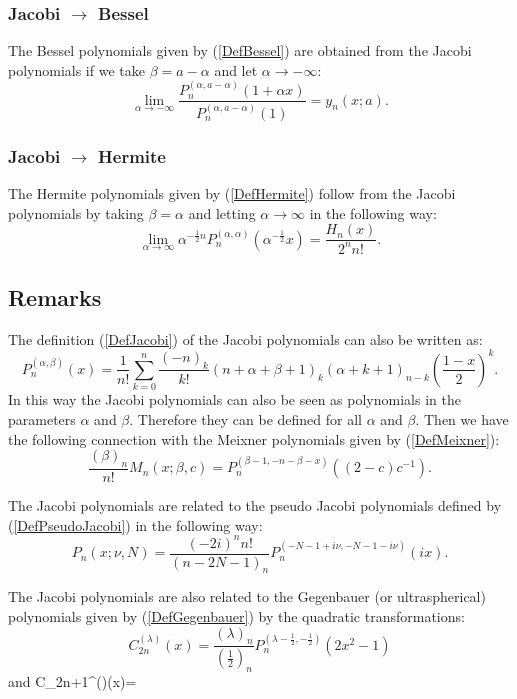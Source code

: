 \documentclass[envcountchap,graybox]{svmono}
\newcounter{rom}
\begin{document}
\subsubsection*{Jacobi $\rightarrow$ Bessel}
The Bessel polynomials given by (\ref{DefBessel}) are obtained from the Jacobi polynomials
if we take $\beta=a-\alpha$ and let $\alpha\rightarrow-\infty$:
\begin{equation}
\lim_{\alpha\rightarrow-\infty}
\frac{P_n^{(\alpha,a-\alpha)}(1+\alpha x)}{P_n^{(\alpha,a-\alpha)}(1)}=y_n(x;a).
\end{equation}

\subsubsection*{Jacobi $\rightarrow$ Hermite}
The Hermite polynomials given by (\ref{DefHermite}) follow from the Jacobi polynomials
by taking $\beta=\alpha$ and letting $\alpha\rightarrow\infty$ in the following way:
\begin{equation}
\lim_{\alpha\rightarrow\infty}
\alpha^{-\frac{1}{2}n}P_n^{(\alpha,\alpha)}(\alpha^{-\frac{1}{2}}x)=\frac{H_n(x)}{2^nn!}.
\end{equation}

\subsection*{Remarks}
The definition (\ref{DefJacobi}) of the Jacobi polynomials can also be written as:
$$P_n^{(\alpha,\beta)}(x)=\frac{1}{n!}\sum_{k=0}^n\frac{(-n)_k}{k!}
(n+\alpha+\beta+1)_k(\alpha+k+1)_{n-k}\left(\frac{1-x}{2}\right)^k.$$
In this way the Jacobi polynomials can also be seen as polynomials in the parameters $\alpha$
and $\beta$. Therefore they can be defined for all $\alpha$ and $\beta$. Then we have the
following connection with the Meixner polynomials given by (\ref{DefMeixner}):
$$\frac{(\beta)_n}{n!}M_n(x;\beta,c)=P_n^{(\beta-1,-n-\beta-x)}((2-c)c^{-1}).$$

\noindent
The Jacobi polynomials are related to the pseudo Jacobi polynomials defined by
(\ref{DefPseudoJacobi}) in the following way:
$$P_n(x;\nu,N)=\frac{(-2i)^nn!}{(n-2N-1)_n}P_n^{(-N-1+i\nu,-N-1-i\nu)}(ix).$$

\noindent
The Jacobi polynomials are also related to the Gegenbauer (or ultraspherical) polynomials
given by (\ref{DefGegenbauer}) by the quadratic transformations:
$$C_{2n}^{(\lambda)}(x)=\frac{(\lambda)_n}{(\frac{1}{2})_n}
P_n^{(\lambda-\frac{1}{2},-\frac{1}{2})}(2x^2-1)$$
and
$$C_{2n+1}^{(\lambda)}(x)=
\end{document}
